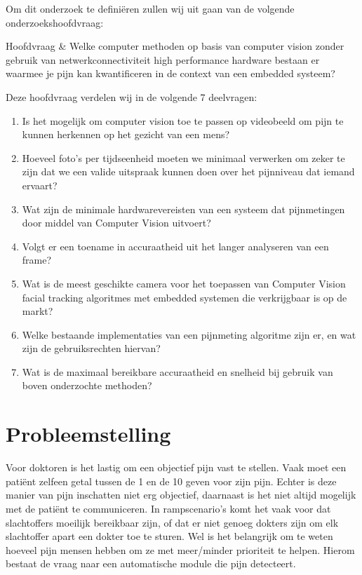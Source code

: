 \documentclass[11pt]{article}
\begin{document}
    Om dit onderzoek te defini\"{e}ren zullen wij uit gaan van de volgende onderzoekshoofdvraag:\\

    \begin{definition}
        Hoofdvraag & Welke computer methoden op basis van computer vision zonder gebruik van netwerkconnectiviteit high performance hardware bestaan er waarmee je pijn kan kwantificeren in de context van een embedded systeem?
    \end{definition}


    \bigskip

    Deze hoofdvraag verdelen wij in de volgende 7 deelvragen:

    \begin{enumerate}
        \item\label{itm:dv1} Is het mogelijk om computer vision toe te passen op videobeeld om pijn te kunnen herkennen op het gezicht van een mens?
        \item\label{itm:dv2} Hoeveel foto's per tijdseenheid moeten we minimaal verwerken om zeker te zijn dat we een valide uitspraak kunnen doen over het pijnniveau dat iemand ervaart?
        \item\label{itm:dv3} Wat zijn de minimale hardwarevereisten van een systeem dat pijnmetingen door middel van Computer Vision uitvoert?
        \item\label{itm:dv4} Volgt er een toename in accuraatheid uit het langer analyseren van een frame?
        \item\label{itm:dv5} Wat is de meest geschikte camera voor het toepassen van Computer Vision facial tracking algoritmes met embedded systemen die verkrijgbaar is op de markt?
        \item\label{itm:dv6} Welke bestaande implementaties van een pijnmeting algoritme zijn er, en wat zijn de gebruiksrechten hiervan?
        \item\label{itm:dv7} Wat is de maximaal bereikbare accuraatheid en snelheid bij gebruik van boven onderzochte methoden?
    \end{enumerate}


    \section{Probleemstelling}\label{sec:probleemstelling}
    Voor doktoren is het lastig om een objectief pijn vast te stellen.
    Vaak moet een pati\"{e}nt zelfeen getal tussen de 1 en de 10 geven voor zijn pijn.
    Echter is deze manier van pijn inschatten niet erg objectief, daarnaast is het niet
    altijd mogelijk met de pati\"{e}nt te communiceren.
    In rampscenario's komt het vaak voor dat slachtoffers moeilijk bereikbaar zijn, of dat er niet genoeg dokters zijn om elk slachtoffer apart een dokter toe te sturen.
    Wel is het belangrijk om te weten hoeveel pijn mensen hebben om ze met meer/minder prioriteit te helpen.
    Hierom bestaat de vraag naar een automatische module die pijn detecteert.
\end{document}
